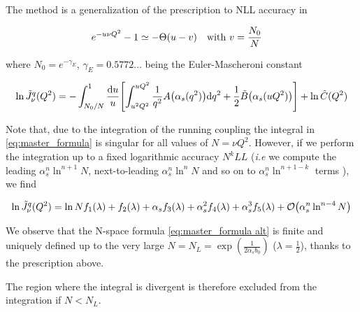 \documentclass[../main.tex]{subfiles}
\begin{document}
The method is a generalization of the prescription to NLL accuracy in \cite{CATANI19933}

\begin{equation}
    e^{-u \nu Q^2} - 1 \simeq -\Theta(u-v) \qq{with $v = \frac{N_0}{N}$}
\end{equation}

where $N_0 = e^{-\gamma_E}$, $\gamma_E = 0.5772 \dots $ being the Euler-Mascheroni constant

\begin{equation}\label{eq:master_formula alt}
    \ln \tilde{J}_\nu^q(Q^2) = - \int_{N_0/N}^{1} \frac{\dd u}{u} \qty[ \int_{u^2 Q^2}^{u Q^2} \frac{1}{q^2} A\qty(\alpha_s(q^2)) \dd q^2 + \frac{1}{2} \tilde{B}\qty(\alpha_s(u Q^2))] + \ln \tilde{C}(Q^2)
\end{equation}

Note that, due to the integration of the running coupling the integral in \cref{eq:master_formula} is singular for all values of $N=\nu Q^2$. However, if we perform the integration up 
to a fixed logarithmic accuracy $N^kLL$ (\emph{i.e} we compute the leading $\alpha_s^n \ln^{n+1}N$, next-to-leading $\alpha_s^n \ln^nN$ and so on to $\alpha_s^n \ln^{n+1-k}$ terms ), we find 

\begin{equation}
    \ln \tilde{J}_\nu^q(Q^2) = \ln N f_1(\lambda) + f_2(\lambda) + \alpha_s f_3(\lambda) + \alpha_s^2 f_4(\lambda) + \alpha_s^3 f_5(\lambda) + \order{\alpha_s^n \ln^{n-4}N}
\end{equation}

We observe that the N-space formula \cref{eq:master_formula alt} is finite and uniquely defined up to the 
very large $N=N_L=\exp(\frac{1}{2\alpha_s b_0})$ ($\lambda = \frac{1}{2}$), thanks to the prescription above.

The region where the integral is divergent is therefore excluded from the integration if $N < N_L$.
\end{document}
